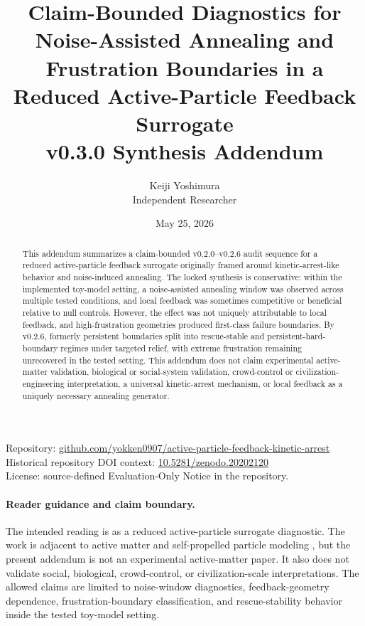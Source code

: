 \documentclass[11pt]{article}
\title{Claim-Bounded Diagnostics for Noise-Assisted Annealing and Frustration Boundaries in a Reduced Active-Particle Feedback Surrogate\\\large v0.3.0 Synthesis Addendum}
\author{Keiji Yoshimura\\\small Independent Researcher}
\date{May 25, 2026}
\begin{document}
\maketitle
\begin{center}
\small
Repository: \href{https://github.com/yokken0907/active-particle-feedback-kinetic-arrest}{github.com/yokken0907/active-particle-feedback-kinetic-arrest}\\
Historical repository DOI context: \href{https://doi.org/10.5281/zenodo.20202120}{10.5281/zenodo.20202120}\\
License: source-defined Evaluation-Only Notice in the repository.
\end{center}

\begin{abstract}
This addendum summarizes a claim-bounded v0.2.0--v0.2.6 audit sequence for a reduced active-particle feedback surrogate originally framed around kinetic-arrest-like behavior and noise-induced annealing. The locked synthesis is conservative: within the implemented toy-model setting, a noise-assisted annealing window was observed across multiple tested conditions, and local feedback was sometimes competitive or beneficial relative to null controls. However, the effect was not uniquely attributable to local feedback, and high-frustration geometries produced first-class failure boundaries. By v0.2.6, formerly persistent boundaries split into rescue-stable and persistent-hard-boundary regimes under targeted relief, with extreme frustration remaining unrecovered in the tested setting. This addendum does not claim experimental active-matter validation, biological or social-system validation, crowd-control or civilization-engineering interpretation, a universal kinetic-arrest mechanism, or local feedback as a uniquely necessary annealing generator.
\end{abstract}

\paragraph{Reader guidance and claim boundary.}
The intended reading is as a reduced active-particle surrogate diagnostic. The work is adjacent to active matter and self-propelled particle modeling \cite{vicsek1995,marchetti2013,bechinger2016,cates2015,fily2012,redner2013}, but the present addendum is not an experimental active-matter paper. It also does not validate social, biological, crowd-control, or civilization-scale interpretations. The allowed claims are limited to noise-window diagnostics, feedback-geometry dependence, frustration-boundary classification, and rescue-stability behavior inside the tested toy-model setting.
\end{document}
